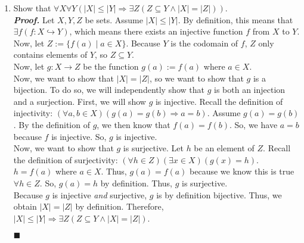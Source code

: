 \documentclass[11pt,a4paper]{article}
\begin{document}
\begin{enumerate}
    \item 
    Show that $\forall X \forall Y (|X| \leq |Y| \Rightarrow \exists Z (Z \subseteq Y \land |X| = |Z|)) $. \\
    \textbf{\emph{Proof.}} Let $X, Y, Z$ be sets. Assume $|X| \leq |Y| $. By definition, this means that $\exists f(f: X \hookrightarrow Y) $, which means
    there exists an injective function $f$ from $X$ to $Y$. \\
    Now, let $Z := \{f(a) \mid a \in X \} $. Because $Y$ is the codomain of $f$, $Z $ only contains elements of $Y$, so $Z \subseteq Y $. \\
    Now, let $g : X \rightarrow Z  $ be the function $g(a) := f(a) $ where $a \in X $. \\
    Now, we want to show that $|X| = |Z| $, so we want to show that $g  $ is a bijection. To do so, we will independently show that $g $ is both an injection and a surjection. 
    First, we will show $g$ is injective. Recall the definition of injectivity: $(\forall a, b \in X)(g(a) = g(b) \Rightarrow a = b) $. Assume $g(a) = g(b) $. 
    By the definition of $g$, we then know that $f(a) = f(b) $. So, we have $a = b$ because $f$ is injective. So, $g$ is injective. \\
    Now, we want to show that $g$ is surjective. Let $h$ be an element of $Z$. Recall the definition of surjectivity: 
    $(\forall h \in Z)(\exists x \in X)(g(x) = h) $. $h = f(a) $ where $a \in X $. Thus, $g(a) = f(a) $ because we know this is true $\forall h \in Z $.      
    So, $g(a) = h $ by definition. Thus, $g $ is surjective. \\
    Because $g $ is injective \emph{and} surjective, $g$ is by definition bijective. Thus, we obtain $|X| = |Z| $ by definition. 
    Therefore, $|X| \leq |Y| \Rightarrow \exists Z(Z \subseteq Y \land |X| = |Z|) $.
    \begin{flushright}
        $\blacksquare$
    \end{flushright}


\end{enumerate}
\end{document}
